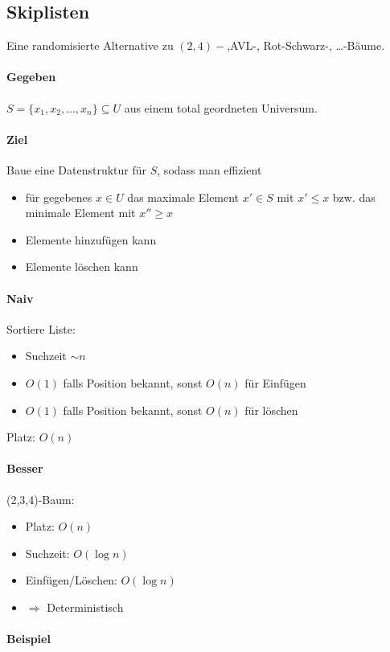 \subsection{Skiplisten}
Eine randomisierte Alternative zu $(2,4)-$,AVL-, Rot-Schwarz-, \dots -Bäume.

\paragraph*{Gegeben} $S = \{ x_1, x_2, \dots, x_n\} \subseteq U$ aus einem total geordneten Universum.

\paragraph*{Ziel} Baue eine Datenstruktur für $S$, sodass man effizient
\begin{itemize}
	\item für gegebenes $x \in U$ das maximale Element $x' \in S$ mit $x' \leq x$ bzw. das minimale Element mit $x'' \geq x$
	\item Elemente hinzufügen kann
	\item Elemente löschen kann
\end{itemize}

\paragraph*{Naiv} Sortiere Liste:
\begin{itemize}
	\item Suchzeit $\sim n$
	\item $O(1)$ falls Position bekannt, sonst $O(n)$ für Einfügen
	\item $O(1)$ falls Position bekannt, sonst $O(n)$ für löschen
\end{itemize}
Platz: $O(n)$

\paragraph*{Besser} (2,3,4)-Baum:
\begin{itemize}
	\item Platz: $O(n)$
	\item Suchzeit: $O(\log n)$
	\item Einfügen/Löschen: $O(\log n)$
	\item $\Rightarrow$ Deterministisch
\end{itemize}

\paragraph*{Beispiel} %

